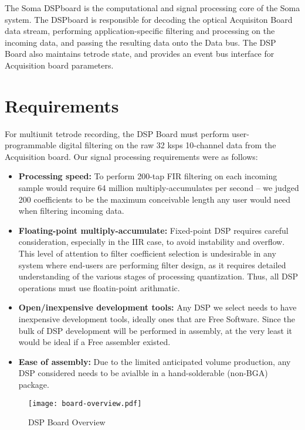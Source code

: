 
The Soma DSPboard is the computational and signal processing core of
the Soma system. The DSPboard is responsible for decoding the optical
Acquisiton Board data stream, performing application-specific
filtering and processing on the incoming data, and passing the
resulting data onto the Data bus. The DSP Board also maintains tetrode
state, and provides an event bus interface for Acquisition board
parameters.

\section{Requirements}
For multiunit tetrode recording, the DSP Board must perform
user-programmable digital filtering on the raw 32 ksps 10-channel data
from the Acquisition board. Our signal processing requirements were as
follows:
    
\begin{itemize}
\item \textbf{Processing speed:} To perform 200-tap FIR filtering on each
  incoming sample would require 64 million multiply-accumulates per
  second -- we judged 200 coefficients to be the maximum conceivable
  length any user would need when filtering incoming data.
  
\item \textbf{Floating-point multiply-accumulate:} Fixed-point DSP requires
  careful consideration, especially in the IIR case, to avoid
  instability and overflow. This level of attention to filter
  coefficient selection is undesirable in any system where end-users
  are performing filter design, as it requires detailed understanding
  of the various stages of processing quantization. Thus, all DSP
  operations must use floatin-point arithmatic.
  
\item \textbf{Open/inexpensive development tools:} Any DSP we select needs to
  have inexpensive development tools, ideally ones that are Free
  Software. Since the bulk of DSP development will be performed in
  assembly, at the very least it would be ideal if a Free assembler
  existed.
  
\item \textbf{Ease of assembly:} Due to the limited anticipated volume
  production, any DSP considered needs to be avialble in a
  hand-solderable (non-BGA) package.
\end{itemize}

\begin{figure}
\begin{center}
\texttt{[image: board-overview.pdf]}
\end{center}
\caption{DSP Board Overview}
\end{figure}


